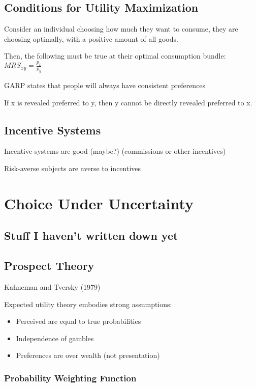 \documentclass[12pt]{article}
\begin{document}
\subsection{Conditions for Utility Maximization}

Consider an individual choosing how much they want to consume, they are choosing optimally, with a positive amount of all goods.

Then, the following must be true at their optimal consumption bundle: $MRS_{xy} = \frac{p_{x}}{p_{y}}$

GARP states that people will always have consistent preferences

If x is revealed preferred to y, then y cannot be directly revealed preferred to x.

\subsection{Incentive Systems}

Incentive systems are good (maybe?) (commissions or other incentives)

Risk-averse subjects are averse to incentives

\newpage
\section{Choice Under Uncertainty}

\subsection{Stuff I haven't written down yet}

\subsection{Prospect Theory}

Kahneman and Tversky (1979)

Expected utility theory embodies strong assumptions:
\begin{itemize}
    \item Perceived are equal to true probabilities
    \item Independence of gambles
    \item Preferences are over wealth (not presentation)
\end{itemize}

\subsubsection{Probability Weighting Function}
\end{document}

